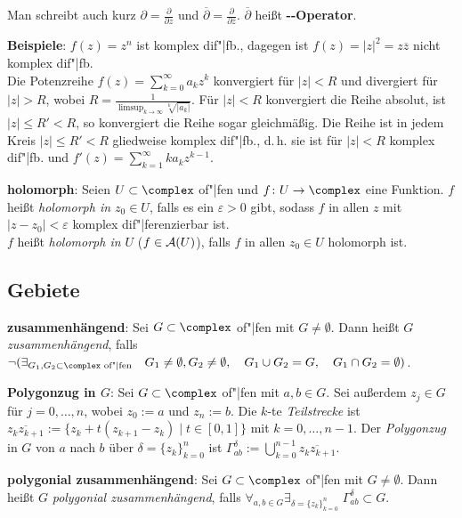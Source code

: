 Man schreibt auch kurz
$\partial = \frac{\partial}{\partial z}$ und
$\overline{\partial} = \frac{\partial}{\partial \overline{z}}$.
$\overline{\partial}$ heißt
\textbf{--Operator}.

\linie

\textbf{Beispiele}:
$f(z) = z^n$ ist komplex dif"|fb.,
dagegen ist $f(z) = |z|^2 = z \overline{z}$ nicht komplex dif"|fb.\\
Die Potenzreihe $f(z) = \sum_{k=0}^\infty a_k z^k$ konvergiert für
$|z| < R$ und divergiert für $|z| > R$, wobei
$R = \frac{1}{\limsup_{k \to \infty} \sqrt[k]{|a_k|}}$.
Für $|z| < R$ konvergiert die Reihe absolut, ist $|z| \le R' < R$,
so konvergiert die Reihe sogar gleichmäßig.
Die Reihe ist in jedem Kreis $|z| \le R' < R$ gliedweise komplex dif"|fb.,
d.\,h. sie ist für $|z| < R$ komplex dif"|fb. und
$f'(z) = \sum_{k=1}^\infty k a_k z^{k-1}$.

\linie

\textbf{holomorph}:
Seien $U \subset \complex$ of"|fen und $f\colon U \rightarrow \complex$
eine Funktion.
$f$ heißt \emph{holomorph in $z_0 \in U$}, falls es ein $\varepsilon > 0$ gibt,
sodass $f$ in allen $z$ mit $|z - z_0| < \varepsilon$ komplex dif"|ferenzierbar
ist.\\
$f$ heißt \emph{holomorph in $U$} ($f \in \mathcal{A}(U)$), falls
$f$ in allen $z_0 \in U$ holomorph ist.

\subsection{%
    Gebiete%
}

\textbf{zusammenhängend}:
Sei $G \subset \complex$ of"|fen mit $G \not= \emptyset$.
Dann heißt $G$ \emph{zusammenhängend}, falls\\
$\lnot(\exists_{G_1, G_2 \subset \complex \text{ of"|fen}}\quad
G_1 \not= \emptyset, G_2 \not= \emptyset,\quad
G_1 \cup G_2 = G,\quad
G_1 \cap G_2 = \emptyset)$.

\linie

\textbf{Polygonzug in $G$}:
Sei $G \subset \complex$ of"|fen mit $a, b \in G$.
Sei außerdem $z_j \in G$ für $j = 0, \dotsc, n$,
wobei $z_0 := a$ und $z_n := b$.
Die $k$-te \emph{Teilstrecke} ist $\overline{z_k z_{k+1}} :=
\{z_k + t(z_{k+1} - z_k) \;|\; t \in [0,1]\}$ mit $k = 0, \dotsc, n - 1$.
Der \emph{Polygonzug} in $G$ von $a$ nach $b$ über $\delta = \{z_k\}_{k=0}^n$
ist $\Gamma_{ab}^\delta := \bigcup_{k=0}^{n-1} \overline{z_k z_{k+1}}$.

\textbf{polygonial zusammenhängend}:
Sei $G \subset \complex$ of"|fen mit $G \not= \emptyset$.
Dann heißt $G$ \emph{polygonial zusammenhängend}, falls
$\forall_{a, b \in G} \exists_{\delta = \{z_k\}_{k=0}^n}\;
\Gamma_{ab}^\delta \subset G$.

